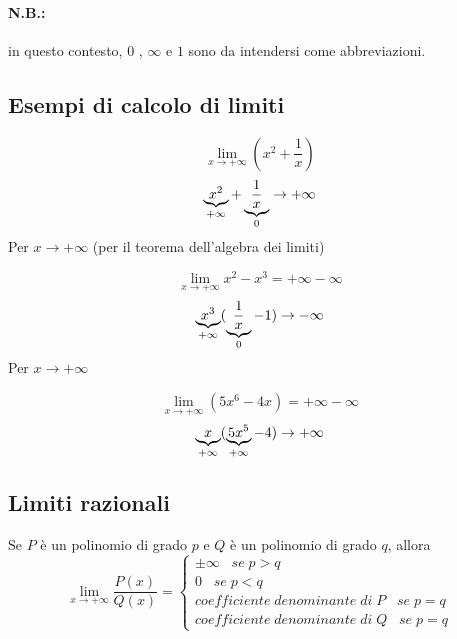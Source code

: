 \documentclass[a4paper]{article}
\theoremstyle{break}
\theoremstyle{break}
\theoremstyle{break}
\theoremstyle{break}
\begin{document}
\paragraph{\textbf{N.B.:}} in questo contesto, \( 0 \) , \( \infty \) e \( 1 \) sono da intendersi
come abbreviazioni.

\subsection{Esempi di calcolo di limiti}
\begin{example}
	\[ \lim_{x \to +\infty} (x^2+\frac{1}{x})  \]
	\[
		\underbrace{x^2}_\text{\( +\infty \)} + \underbrace{\frac{1}{x}}_\text{\( 0 \)} \to +\infty
	\]
	Per \( x \to +\infty \) (per il teorema dell'algebra dei limiti)
\end{example}
\begin{example}
	\[
		\lim_{x \to +\infty} x^2-x^3 = +\infty - \infty
	\]
	\[
		\underbrace{x^3}_\text{\( +\infty \)}(\underbrace{\frac{1}{x}}_\text{\( 0 \)} - 1) \to -\infty
	\]
	Per \( x \to +\infty \)
\end{example}
\begin{example}
	\[
		\lim_{x \to +\infty} (5x^6-4x) = +\infty - \infty
	\]
	\[
		\underbrace{x}_\text{\( +\infty \)}(\underbrace{5x^5}_\text{\( +\infty \)} - 4) \to +\infty
	\]
\end{example}


\subsection{Limiti razionali}
Se \( P \) è un polinomio di grado \( p \) e \( Q \) è un polinomio di grado \( q \), allora
\[
	\lim_{x \to +\infty} \frac{P(x)}{Q(x)}=
	\begin{cases}
		\pm \infty\;\;\; se\; p > q                          \\
		0\;\;\; se\; p < q                                   \\
		coefficiente\; denominante\; di\; P\;\;\; se\; p = q \\
		coefficiente\; denominante\; di\; Q\;\;\; se\; p = q
	\end{cases}
\]
\end{document}
